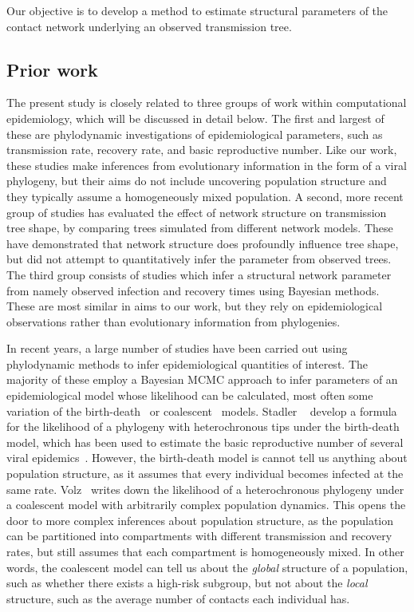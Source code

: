 Our objective is to develop a method to estimate structural parameters of the
contact network underlying an observed transmission tree.

\subsection{Prior work}

The present study is closely related to three groups of work within
computational epidemiology, which will be discussed in detail below. The first
and largest of these are phylodynamic investigations of epidemiological
parameters, such as transmission rate, recovery rate, and basic reproductive
number. Like our work, these studies make inferences from evolutionary
information in the form of a viral phylogeny, but their aims do not include
uncovering population structure and they typically assume a homogeneously mixed
population. A second, more recent group of studies has evaluated the effect of
network structure on transmission tree shape, by comparing trees simulated from
different network models. These have demonstrated that network structure does
profoundly influence tree shape, but did not attempt to quantitatively infer
the parameter from observed trees. The third group consists of studies which
infer a structural network parameter from namely observed infection and
recovery times using Bayesian methods. These are most similar in aims to our
work, but they rely on epidemiological observations rather than evolutionary
information from phylogenies.

In recent years, a large number of studies have been carried out using
phylodynamic methods to infer epidemiological quantities of interest. The
majority of these employ a Bayesian \gls{MCMC} approach to infer parameters of
an epidemiological model whose likelihood can be calculated, most often some
variation of the birth-death~\autocite{kendall1948generalized} or
coalescent~\autocite{kingman1982coalescent} models. Stadler
\etal~\autocite{stadler2011estimating} develop a formula for the likelihood of
a phylogeny with heterochronous tips under the birth-death model, which has
been used to estimate the basic reproductive number of several viral
epidemics~\autocite{stadler2011estimating}. However, the birth-death model is
cannot tell us anything about population structure, as it assumes that every
individual becomes infected at the same rate. Volz~\autocite{volz2012complex}
writes down the likelihood of a heterochronous phylogeny under a coalescent
model with arbitrarily complex population dynamics. This opens the door to more
complex inferences about population structure, as the population can be
partitioned into compartments with different transmission and recovery rates,
but still assumes that each compartment is homogeneously mixed. In other words, 
the coalescent model can tell us about the \emph{global} structure of a
population, such as whether there exists a high-risk subgroup, but not about
the \emph{local} structure, such as the average number of contacts each
individual has.

